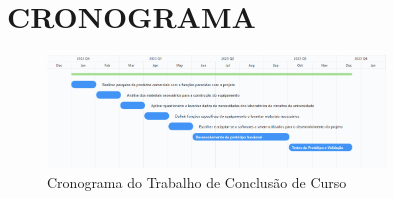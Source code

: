 \section{CRONOGRAMA}\label{sec:cronogramsboi}

\begin{figure}[htb!]
    \caption{Cronograma do Trabalho de Conclusão de Curso}
    \label{fig:cronograma}
    \includegraphics[width=0.8\textwidth]{figuras/gantt-cronograma.png}
    \fonte{}
\end{figure}
